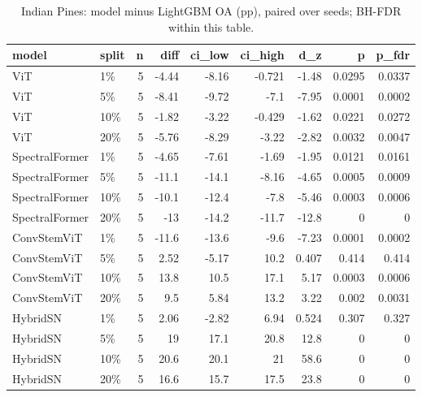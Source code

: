\begin{table}
\caption{Indian Pines: model minus LightGBM OA (pp), paired over seeds; BH-FDR within this table.}
\label{tab:stats_ip_vs_lightgbm}
\begin{tabular}{llrrrrrrr}
\toprule
model & split & n & diff & ci\_low & ci\_high & d\_z & p & p\_fdr \\
\midrule
ViT & 1\% & 5 & -4.44 & -8.16 & -0.721 & -1.48 & 0.0295 & 0.0337 \\
ViT & 5\% & 5 & -8.41 & -9.72 & -7.1 & -7.95 & 0.0001 & 0.0002 \\
ViT & 10\% & 5 & -1.82 & -3.22 & -0.429 & -1.62 & 0.0221 & 0.0272 \\
ViT & 20\% & 5 & -5.76 & -8.29 & -3.22 & -2.82 & 0.0032 & 0.0047 \\
SpectralFormer & 1\% & 5 & -4.65 & -7.61 & -1.69 & -1.95 & 0.0121 & 0.0161 \\
SpectralFormer & 5\% & 5 & -11.1 & -14.1 & -8.16 & -4.65 & 0.0005 & 0.0009 \\
SpectralFormer & 10\% & 5 & -10.1 & -12.4 & -7.8 & -5.46 & 0.0003 & 0.0006 \\
SpectralFormer & 20\% & 5 & -13 & -14.2 & -11.7 & -12.8 & 0 & 0 \\
ConvStemViT & 1\% & 5 & -11.6 & -13.6 & -9.6 & -7.23 & 0.0001 & 0.0002 \\
ConvStemViT & 5\% & 5 & 2.52 & -5.17 & 10.2 & 0.407 & 0.414 & 0.414 \\
ConvStemViT & 10\% & 5 & 13.8 & 10.5 & 17.1 & 5.17 & 0.0003 & 0.0006 \\
ConvStemViT & 20\% & 5 & 9.5 & 5.84 & 13.2 & 3.22 & 0.002 & 0.0031 \\
HybridSN & 1\% & 5 & 2.06 & -2.82 & 6.94 & 0.524 & 0.307 & 0.327 \\
HybridSN & 5\% & 5 & 19 & 17.1 & 20.8 & 12.8 & 0 & 0 \\
HybridSN & 10\% & 5 & 20.6 & 20.1 & 21 & 58.6 & 0 & 0 \\
HybridSN & 20\% & 5 & 16.6 & 15.7 & 17.5 & 23.8 & 0 & 0 \\
\bottomrule
\end{tabular}
\end{table}
